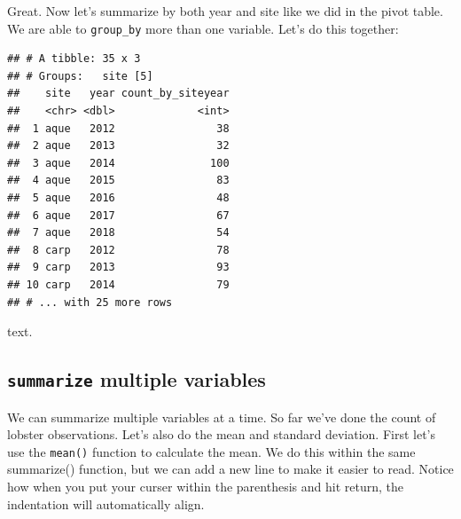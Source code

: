 \documentclass[]{book}
\newenvironment{Shaded}{\begin{snugshade}}{\end{snugshade}}
\newcommand{\DataTypeTok}[1]{\textcolor[rgb]{0.13,0.29,0.53}{#1}}
\newcommand{\KeywordTok}[1]{\textcolor[rgb]{0.13,0.29,0.53}{\textbf{#1}}}
\newcommand{\NormalTok}[1]{#1}
\newcommand{\OperatorTok}[1]{\textcolor[rgb]{0.81,0.36,0.00}{\textbf{#1}}}
\newcommand{\StringTok}[1]{\textcolor[rgb]{0.31,0.60,0.02}{#1}}
\begin{document}
Great. Now let's summarize by both year and site like we did in the pivot table. We are able to \texttt{group\_by} more than one variable. Let's do this together:

\begin{Shaded}
\end{Shaded}

\begin{verbatim}
## # A tibble: 35 x 3
## # Groups:   site [5]
##    site   year count_by_siteyear
##    <chr> <dbl>             <int>
##  1 aque   2012                38
##  2 aque   2013                32
##  3 aque   2014               100
##  4 aque   2015                83
##  5 aque   2016                48
##  6 aque   2017                67
##  7 aque   2018                54
##  8 carp   2012                78
##  9 carp   2013                93
## 10 carp   2014                79
## # ... with 25 more rows
\end{verbatim}

text.

\hypertarget{summarize-multiple-variables}{%
\subsection{\texorpdfstring{\texttt{summarize} multiple variables}{summarize multiple variables}}\label{summarize-multiple-variables}}

We can summarize multiple variables at a time. So far we've done the count of lobster observations. Let's also do the mean and standard deviation. First let's use the \texttt{mean()} function to calculate the mean. We do this within the same summarize() function, but we can add a new line to make it easier to read. Notice how when you put your curser within the parenthesis and hit return, the indentation will automatically align.

\begin{Shaded}
\end{Shaded}
\end{document}
